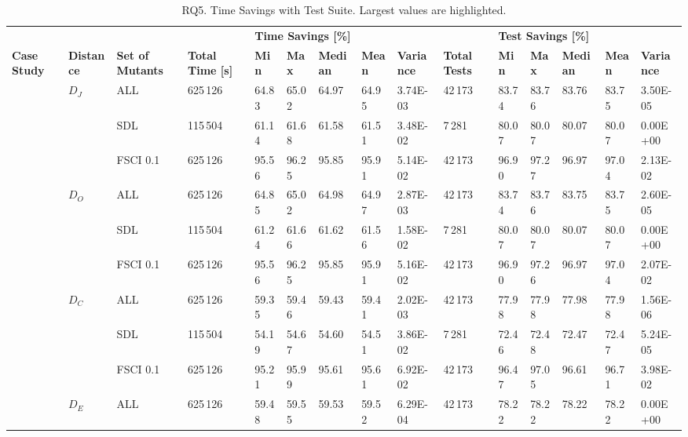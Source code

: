 
\begin{table*}[h]
\caption{RQ5. Time Savings with \APPR Test Suite. Largest values are highlighted.}
\label{table:results:reduction:prioritize} 
\tiny
\centering
\begin{tabular}{|lllllllllllllll|}
\hline
\textbf{}  &    &   &  & \multicolumn{5}{l}{\textbf{Time Savings [\%]}}    &    & \multicolumn{5}{l|}{\textbf{Test Savings [\%]}}  \\
\textbf{Case Study} & \textbf{Distance} & \textbf{Set of Mutants}& \textbf{Total Time [s]} & \textbf{Min} & \textbf{Max} & \textbf{Median} & \textbf{Mean} & \textbf{Variance} & \textbf{Total Tests} &\textbf{Min} & \textbf{Max} & \textbf{Median} & \textbf{Mean} & \textbf{Variance} \\
\hline
\multirow{12}{*}{\GCSP{}} & \multirow{3}{*}{$D_J$}   & ALL  & 625\,126 & 64.83  & 65.02 & 64.97 & 64.95   & 3.74E-03  & 42\,173  & 83.74  & 83.76  & 83.76 & 83.75   & 3.50E-05    \\
 & & SDL & 115\,504 & 61.14  & 61.68  & 61.58 & 61.51   & 3.48E-02 & 7\,281   & 80.07  & 80.07  & 80.07 & 80.07   & 0.00E+00    \\
 & & FSCI 0.1   &  625\,126 & 95.56  & 96.25  & 95.85 & 95.91   & 5.14E-02  & 42\,173  & 96.90  & 97.27  & 96.97 & 97.04   & 2.13E-02    \\
 & \multirow{3}{*}{$D_O$}    & ALL & 625\,126 & 64.85  & 65.02  & 64.98 & 64.97   & 2.87E-03  & 42\,173  & 83.74  & 83.76  & 83.75 & 83.75   & 2.60E-05    \\
 & & SDL  & 115\,504& 61.24  & 61.66  & 61.62 & 61.56   & 1.58E-02  & 7\,281  & 80.07  & 80.07  & 80.07 & 80.07   & 0.00E+00    \\
 & & FSCI 0.1    & 625\,126 & 95.56  & 96.25  & 95.85 & 95.91   & 5.16E-02  & 42\,173  & 96.90  & 97.26  & 96.97 & 97.04   & 2.07E-02    \\
 & \multirow{3}{*}{$D_C$}    & ALL  &625\,126 & 59.35  & 59.46  & 59.43 & 59.41   & 2.02E-03 & 42\,173   & 77.98  & 77.98  & 77.98 & 77.98   & 1.56E-06    \\
 & & SDL  &115\,504 & 54.19  & 54.67  & 54.60 & 54.51   & 3.86E-02  & 7\,281  & 72.46  & 72.48  & 72.47 & 72.47   & 5.24E-05    \\
 & & FSCI 0.1    & 625\,126 & 95.21  & 95.99  & 95.61 & 95.61   & 6.92E-02  & 42\,173  & 96.47  & 97.05  & 96.61 & 96.71   & 3.98E-02    \\
 & \multirow{3}{*}{$D_E$} & ALL  & 625\,126& 59.48  & 59.55  & 59.53 & 59.52   & 6.29E-04  & 42\,173  & 78.22  & 78.22  & 78.22 & 78.22   & 0.00E+00    \\

\end{tabular}
\end{table*}
